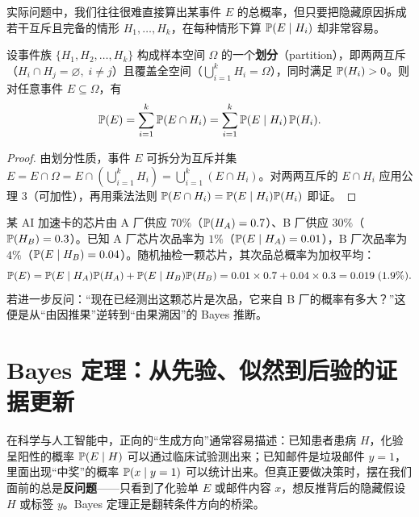 实际问题中，我们往往很难直接算出某事件 $E$ 的总概率，但只要把隐藏原因拆成若干互斥且完备的情形 $H_1, \dots, H_k$，在每种情形下算 $\mathbb{P}(E \mid H_i)$ 却非常容易。

\begin{thmBox}
\begin{theorem}
\label{thm:ch1-total-prob}
设事件族 $\{H_1, H_2, \dots, H_k\}$ 构成样本空间 $\Omega$ 的一个\textbf{划分}（partition），即两两互斥（$H_i \cap H_j = \varnothing,\; i\neq j$）且覆盖全空间（$\bigcup_{i=1}^k H_i = \Omega$），同时满足 $\mathbb{P}(H_i) > 0$。则对任意事件 $E \subseteq \Omega$，有
\begin{equation}
  \mathbb{P}(E) = \sum_{i=1}^k \mathbb{P}(E \cap H_i) = \sum_{i=1}^k \mathbb{P}(E \mid H_i)\,\mathbb{P}(H_i). \label{eq:ch1-total-prob}
\end{equation}
\end{theorem}
\end{thmBox}

\begin{proof}
由划分性质，事件 $E$ 可拆分为互斥并集 $E = E \cap \Omega = E \cap \left(\bigcup_{i=1}^k H_i\right) = \bigcup_{i=1}^k (E \cap H_i)$。对两两互斥的 $E \cap H_i$ 应用公理 3（可加性），再用乘法法则 $\mathbb{P}(E \cap H_i) = \mathbb{P}(E \mid H_i)\mathbb{P}(H_i)$ 即证。
\end{proof}

\begin{example}[两座晶圆厂的芯片良品率]
\label{ex:ch1-chip-factory}
某 AI 加速卡的芯片由 A 厂供应 $70\%$（$\mathbb{P}(H_A)=0.7$）、B 厂供应 $30\%$（$\mathbb{P}(H_B)=0.3$）。已知 A 厂芯片次品率为 $1\%$（$\mathbb{P}(E\mid H_A)=0.01$），B 厂次品率为 $4\%$（$\mathbb{P}(E\mid H_B)=0.04$）。随机抽检一颗芯片，其次品总概率为加权平均：
\[
  \mathbb{P}(E) = \mathbb{P}(E\mid H_A)\mathbb{P}(H_A) + \mathbb{P}(E\mid H_B)\mathbb{P}(H_B) = 0.01\times 0.7 + 0.04\times 0.3 = 0.019\;(1.9\%).
\]
若进一步反问：“现在已经测出这颗芯片是次品，它来自 B 厂的概率有多大？”这便是从“由因推果”逆转到“由果溯因”的 Bayes 推断。
\end{example}

\section{Bayes 定理：从先验、似然到后验的证据更新}
\label{sec:ch1-bayes}

在科学与人工智能中，正向的“生成方向”通常容易描述：已知患者患病 $H$，化验呈阳性的概率 $\mathbb{P}(E\mid H)$ 可以通过临床试验测出来；已知邮件是垃圾邮件 $y=1$，里面出现“中奖”的概率 $\mathbb{P}(x\mid y=1)$ 可以统计出来。但真正要做决策时，摆在我们面前的总是\textbf{反问题}——只看到了化验单 $E$ 或邮件内容 $x$，想反推背后的隐藏假设 $H$ 或标签 $y$。Bayes 定理正是翻转条件方向的桥梁。

